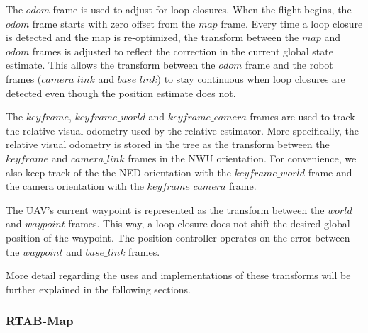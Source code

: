 \documentclass[letterpaper, 10 pt, conference]{ieeeconf}  %
\begin{document}
The $\mathit{odom}$ frame is used to adjust for loop closures. When the flight begins, the $\mathit{odom}$ frame starts with zero offset from the $\mathit{map}$ frame. Every time a loop closure is detected and the map is re-optimized, the transform between the $\mathit{map}$ and $\mathit{odom}$ frames is adjusted to reflect the correction in the current global state estimate. This allows the transform between the $\mathit{odom}$ frame and the robot frames ($\mathit{camera\_link}$ and $\mathit{base\_link}$) to stay continuous when loop closures are detected even though the position estimate does not.

The $\mathit{keyframe}$, $\mathit{keyframe\_world}$ and $\mathit{keyframe\_camera}$ frames are used to track the relative visual odometry used by the relative estimator. More specifically, the relative visual odometry is stored in the tree as the transform between the $\mathit{keyframe}$ and $\mathit{camera\_link}$ frames in the NWU orientation. For convenience, we also keep track of the the NED orientation with the $\mathit{keyframe\_world}$ frame and the camera orientation with the $\mathit{keyframe\_camera}$ frame.

The UAV's current waypoint is represented as the transform between the $\mathit{world}$ and $\mathit{waypoint}$ frames. This way, a loop closure does not shift the desired global position of the waypoint. The position controller operates on the error between the $\mathit{waypoint}$ and $\mathit{base\_link}$ frames.

More detail regarding the uses and implementations of these transforms will be further explained in the following sections.


\subsubsection{RTAB-Map}
\end{document}
